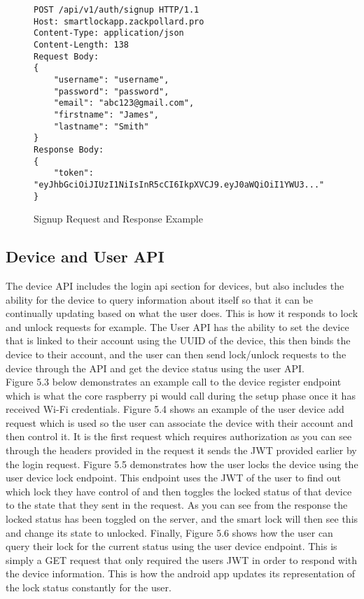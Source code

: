 \begin{figure}[H]
	\caption{Signup Request and Response Example}
	\begin{Verbatim}[frame=single]
POST /api/v1/auth/signup HTTP/1.1
Host: smartlockapp.zackpollard.pro
Content-Type: application/json
Content-Length: 138
Request Body:
{
	"username": "username",
	"password": "password",
	"email": "abc123@gmail.com",
	"firstname": "James",
	"lastname": "Smith"
}
Response Body:
{
	"token": "eyJhbGciOiJIUzI1NiIsInR5cCI6IkpXVCJ9.eyJ0aWQiOiI1YWU3..."
}
	\end{Verbatim}
\end{figure}

\subsection{Device and User API}
The device API includes the login api section for devices, but also includes the ability for the device to query information about itself so that it can be continually updating based on what the user does. This is how it responds to lock and unlock requests for example. The User API has the ability to set the device that is linked to their account using the UUID of the device, this then binds the device to their account, and the user can then send lock/unlock requests to the device through the API and get the device status using the user API.
\\
\indent Figure 5.3 below demonstrates an example call to the device register endpoint which is what the core raspberry pi would call during the setup phase once it has received Wi-Fi credentials. Figure 5.4 shows an example of the user device add request which is used so the user can associate the device with their account and then control it. It is the first request which requires authorization as you can see through the headers provided in the request it sends the JWT provided earlier by the login request. Figure 5.5 demonstrates how the user locks the device using the user device lock endpoint. This endpoint uses the JWT of the user to find out which lock they have control of and then toggles the locked status of that device to the state that they sent in the request. As you can see from the response the locked status has been toggled on the server, and the smart lock will then see this and change its state to unlocked. Finally, Figure 5.6 shows how the user can query their lock for the current status using the user device endpoint. This is simply a GET request that only required the users JWT in order to respond with the device information. This is how the android app updates its representation of the lock status constantly for the user.

